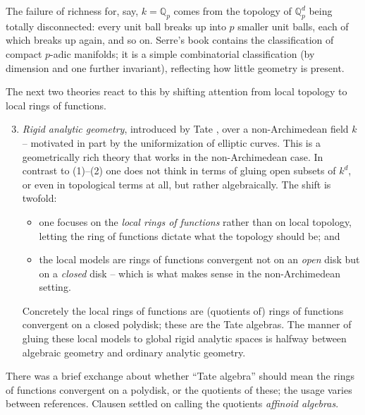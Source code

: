 \begin{remark}
\label{rmk:1:totally-disconnected}
The failure of richness for, say, $k=\mathbb{Q}_p$ comes from the topology of
$\mathbb{Q}_p^d$ being totally disconnected: every unit ball breaks up into $p$
smaller unit balls, each of which breaks up again, and so on. Serre's book
\cite{Serre_1992} contains the classification of compact $p$-adic manifolds; it
is a simple combinatorial classification (by dimension and one further
invariant), reflecting how little geometry is present.
\end{remark}

The next two theories react to this by shifting attention from local topology to
local rings of functions.

\begin{enumerate}
\setcounter{enumi}{2}
\item \emph{Rigid analytic geometry}, introduced by Tate \cite{Tate_1971}, over
a non-Archimedean field $k$ -- motivated in part by the uniformization of
elliptic curves. This is a geometrically rich theory that works in the
non-Archimedean case. In contrast to (1)--(2) one does not think in terms of
gluing open subsets of $k^d$, or even in topological terms at all, but rather
algebraically. The shift is twofold:
\begin{itemize}
\item one focuses on the \emph{local rings of functions} rather than on local
topology, letting the ring of functions dictate what the topology should be; and
\item the local models are rings of functions convergent not on an \emph{open}
disk but on a \emph{closed} disk -- which is what makes sense in the
non-Archimedean setting.
\end{itemize}
Concretely the local rings of functions are (quotients of) rings of functions
convergent on a closed polydisk; these are the Tate algebras. The manner of
gluing these local models to global rigid analytic spaces is halfway between
algebraic geometry and ordinary analytic geometry.
\end{enumerate}

\begin{remark}[Terminology]
\label{rmk:1:affinoid-terminology}
There was a brief exchange about whether ``Tate algebra'' should mean the rings
of functions convergent on a polydisk, or the quotients of these; the usage
varies between references. Clausen settled on calling the quotients
\emph{affinoid algebras}.
\end{remark}

